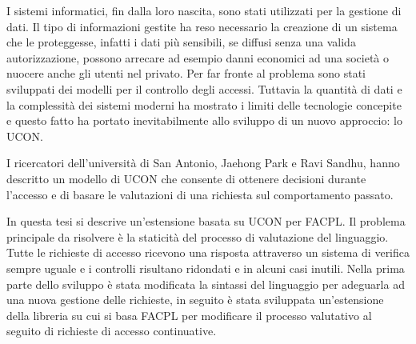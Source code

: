 I sistemi informatici, fin dalla loro nascita, sono stati utilizzati per la gestione di dati.
Il tipo di informazioni gestite ha reso necessario la creazione di un sistema che le proteggesse, infatti i
dati più sensibili, se diffusi senza una valida autorizzazione, possono arrecare ad esempio danni economici
ad una società o nuocere anche gli utenti nel privato.
Per far fronte al problema sono stati sviluppati dei modelli per il controllo degli accessi. Tuttavia la quantità di dati
e la complessità dei sistemi moderni ha mostrato i limiti delle tecnologie concepite e questo fatto ha portato inevitabilmente
allo sviluppo di un nuovo approccio: lo \ac{UCON}.

I ricercatori dell'università di San Antonio, Jaehong Park e Ravi Sandhu, hanno descritto un modello
di \ac{UCON}\cite{ucon} che consente di ottenere decisioni durante l'accesso e di basare le valutazioni di una richiesta
sul comportamento passato.

In questa tesi si descrive un'estensione basata su UCON per \ac{FACPL}.
Il problema principale da risolvere è la staticità del processo di valutazione del linguaggio.
Tutte le richieste di accesso ricevono una risposta attraverso un sistema di verifica sempre uguale e i controlli
risultano ridondati e in alcuni casi inutili.
Nella prima parte dello sviluppo è stata modificata la sintassi del linguaggio per adeguarla ad una nuova
gestione delle richieste, in seguito
è stata sviluppata un'estensione della libreria su cui si basa \ac{FACPL} per modificare
il processo valutativo al seguito di richieste di accesso continuative.

